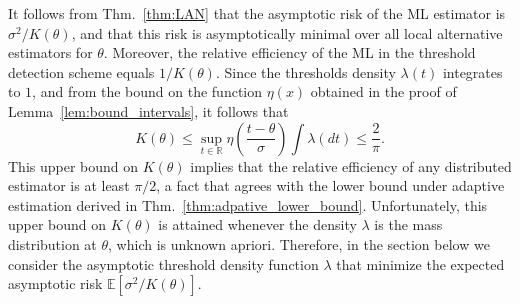 \documentclass[letterpaper, conference]{IEEEtran}      %
\begin{document}
It follows from Thm.~\ref{thm:LAN} that the asymptotic risk of the ML estimator is $\sigma^2/K(\theta)$, and that this risk is asymptotically minimal over all local alternative estimators for $\theta$. Moreover, the relative efficiency of the ML in the threshold detection scheme equals $1/K(\theta)$. Since the thresholds density $\lambda(t)$ integrates to $1$, and from the bound on the function $\eta(x)$ obtained in the proof of Lemma~\ref{lem:bound_intervals}, it follows that
\[
K(\theta) \leq \sup_{t\in \mathbb R} \eta \left( \frac{t-\theta}{\sigma} \right) \int  \lambda(dt)  \leq \frac{2}{\pi}.
\]
This upper bound on $K(\theta)$ implies that the relative efficiency of any distributed estimator is at least $\pi/2$, a fact that agrees with the lower bound under adaptive estimation derived in Thm.~\ref{thm:adpative_lower_bound}. Unfortunately, this upper bound on $K(\theta)$ is attained whenever the density $\lambda$ is the mass distribution at $\theta$, which is unknown apriori. Therefore, in the section below we consider the asymptotic threshold density function $\lambda$ that minimize the expected asymptotic risk $\mathbb E\left [\sigma^2/K(\theta) \right]$. 
\end{document}
